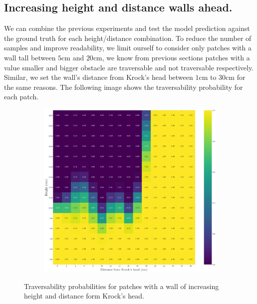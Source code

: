 \subsection{Increasing height and distance walls ahead.}
We can combine the previous experiments and test the model prediction against the ground truth for each height/distance combination. To reduce the number of samples and improve readability, we limit ourself to consider only patches with a wall tall between $5$cm and $20$cm, we know from previous sections patches with a value smaller and bigger obstacle are traversable and not traversable respectively. Similar, we set the wall's distance from Krock's head between $1$cm to $30$cm for the same reasons. The following image shows the traversability probability for each patch.
\begin{figure}[H]
    \centering
\begin{subfigure}[b]{1\textwidth}
    \includegraphics[width=\linewidth]{../img/5/custom_patches/walls_heights/walls_heights.png}
    \end{subfigure}
    \caption{Traversability probabilities for patches with a wall of increasing height and distance form Krock's head.}
\end{figure}



